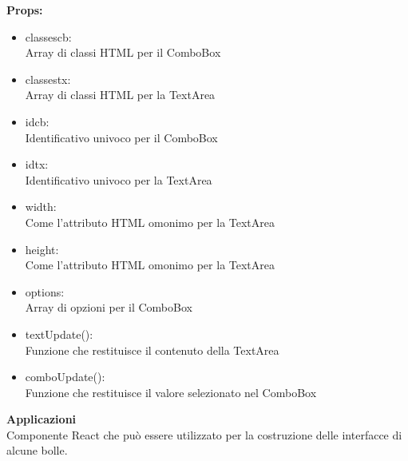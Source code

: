 \textbf{Props:} 
\begin{itemize}
\item classescb: 
\\
Array di classi HTML per il ComboBox
\item classestx: 
\\
Array di classi HTML per la TextArea
\item idcb: 
\\
Identificativo univoco per il ComboBox
\item idtx: 
\\
Identificativo univoco per la TextArea
\item width: 
\\
Come l'attributo HTML omonimo per la TextArea
\item height: 
\\
Come l'attributo HTML omonimo per la TextArea
\item options: 
\\
Array di opzioni per il ComboBox
\item textUpdate(): 
\\
Funzione che restituisce il contenuto della TextArea
\item comboUpdate():
\\
Funzione che restituisce il valore selezionato nel ComboBox



\end{itemize} 


\textbf{Applicazioni}\\
Componente React che può essere utilizzato per la costruzione delle interfacce di alcune bolle. 


\clearpage

